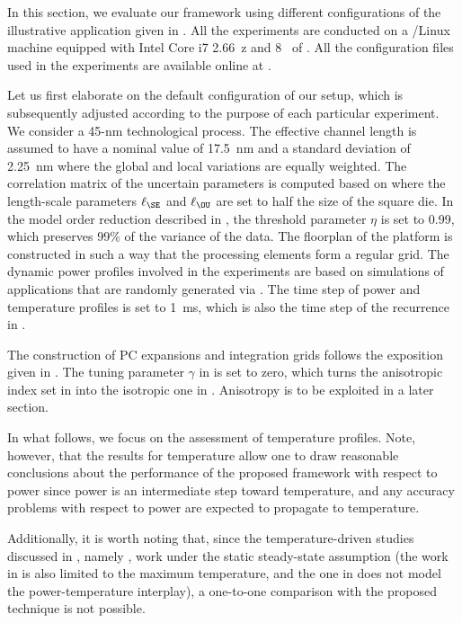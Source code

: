 In this section, we evaluate our framework using different configurations of the
illustrative application given in . All the
experiments are conducted on a /Linux machine equipped with Intel Core
i7 2.66~z and 8~ of . All the configuration files used in
the experiments are available online at \cite{eslab2014b}.

Let us first elaborate on the default configuration of our setup, which is
subsequently adjusted according to the purpose of each particular experiment. We
consider a 45-nm technological process. The effective channel length is assumed
to have a nominal value of 17.5~nm \cite{ptm} and a standard deviation of
2.25~nm where the global and local variations are equally weighted. The
correlation matrix of the uncertain parameters is computed based on
 where the length-scale parameters $\ell_\SE$ and
$\ell_\OU$ are set to half the size of the square die. In the model order
reduction described in , the threshold
parameter $\eta$ is set to 0.99, which preserves 99\% of the variance of the
data. The floorplan of the platform is constructed in such a way that the
processing elements form a regular grid. The dynamic power profiles involved in
the experiments are based on simulations of applications that are randomly
generated via  \cite{dick1998}. The time step \dt of power and
temperature profiles is set to 1~ms, which is also the time step of the
recurrence in .

The construction of \ac{PC} expansions and integration grids follows the
exposition given in . The tuning parameter $\gamma$ in
 is set to zero, which turns the anisotropic
index set in  into the isotropic one in
. Anisotropy is to be exploited in a later
section.

In what follows, we focus on the assessment of temperature profiles. Note,
however, that the results for temperature allow one to draw reasonable
conclusions about the performance of the proposed framework with respect to
power since power is an intermediate step toward temperature, and any accuracy
problems with respect to power are expected to propagate to temperature.

Additionally, it is worth noting that, since the temperature-driven studies
discussed in , namely \cite{huang2009a, juan2011, juan2012,
lee2013}, work under the static steady-state assumption (the work in
\cite{juan2011} is also limited to the maximum temperature, and the one in
\cite{huang2009a} does not model the power-temperature interplay), a one-to-one
comparison with the proposed technique is not possible.

